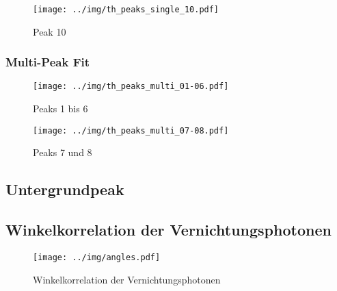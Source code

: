\begin{figure}[H]
\begin{center}
  \texttt{[image: ../img/th\_peaks\_single\_10.pdf]}
  \caption{Peak 10}
  \label{img:th:peaks:single:10}
\end{center}
\end{figure}

\subsubsection{Multi-Peak Fit} %
\begin{figure}[H]
\begin{center}
  \texttt{[image: ../img/th\_peaks\_multi\_01-06.pdf]}
  \caption{Peaks 1 bis 6}
  \label{img:th:peaks:multi:0106}
\end{center}
\end{figure}

\begin{figure}[H]
\begin{center}
  \texttt{[image: ../img/th\_peaks\_multi\_07-08.pdf]}
  \caption{Peaks 7 und 8}
  \label{img:th:peaks:multi:0708}
\end{center}
\end{figure}

\subsection{Untergrundpeak}
\label{sub:eval:undergroundpeak}

\subsection{Winkelkorrelation der  Vernichtungsphotonen}
\begin{figure}[H]
\begin{center}
  \texttt{[image: ../img/angles.pdf]}
  \caption{Winkelkorrelation der  Vernichtungsphotonen}
  \label{img:angles}
\end{center}
\end{figure}

